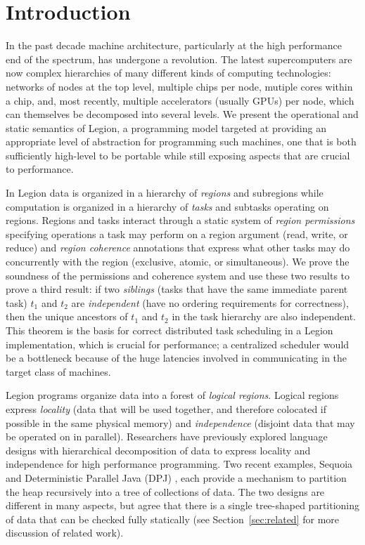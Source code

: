 

\section{Introduction}
\label{sec:intro}

In the past decade machine architecture, particularly at the high
performance end of the spectrum, has undergone a revolution.  The
latest supercomputers are now complex hierarchies of many different
kinds of computing technologies: networks of nodes at the top level,
multiple chips per node, mutiple cores within a chip, and, most
recently, multiple accelerators (usually GPUs) per node, which 
can themselves be decomposed into several levels.   We present the operational and static
semantics of Legion, a programming model targeted at providing an
appropriate level of abstraction for programming such machines, one
that is both sufficiently high-level to be portable while still
exposing aspects that are crucial to performance. 

In Legion data is organized in a hierarchy of {\em regions}
and subregions while computation is organized in a hierarchy of {\em
tasks} and subtasks operating on regions.  Regions and tasks interact
through a static system of {\em region permissions} specifying 
operations a task may perform on a region argument (read,
write, or reduce) and  {\em region coherence} annotations that
express what other tasks may do concurrently with
the region (exclusive, atomic, or simultaneous).  We prove the
soundness of the permissions and coherence system and use these two
results to prove a third result: if two {\em siblings} (tasks that
have the same immediate parent task) $t_1$ and $t_2$ are 
{\em independent} (have no ordering requirements for correctness), 
then the unique ancestors of $t_1$ and $t_2$ in the task hierarchy 
are also independent.  This theorem is the basis for correct distributed
task scheduling in a Legion implementation, which is crucial for
performance; a centralized scheduler would be a bottleneck
because of the huge latencies involved in communicating in the target
class of machines.

Legion programs organize data into a forest of {\em logical regions}.  Logical
regions express {\em locality} (data that will be used together, and therefore colocated if possible in the same
physical memory) and {\em independence} (disjoint data that may be operated on in parallel).
Researchers have previously explored language designs with hierarchical decomposition of data to express
locality and independence for high performance programming. Two recent examples, Sequoia \cite{Fatahalian06} and 
Deterministic Parallel Java (DPJ) \cite{Bocchino09}, each provide a mechanism to partition the heap recursively
into a tree of collections of data.  The two designs are different in many aspects, but agree that there is
a single tree-shaped partitioning of data that can be checked fully statically (see Section~\ref{sec:related} for more
discussion of related work).

